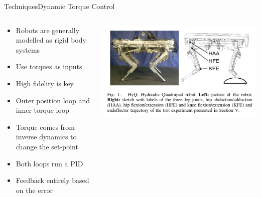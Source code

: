 \documentclass{beamer}
\begin{document}
\begin{frame}{Techniques}{Dynamic Torque Control\cite{6224628}}
\begin{columns}
    \begin{column}{0.47\textwidth}\begin{small}
		\begin{itemize}
			\item Robots are generally modelled as rigid body systems
			\item Use torques as inputs
			\item High fidelity is key
			\item Outer position loop and inner torque loop
			\item Torque comes from inverse dynamics to change the set-point
			\item Both loops run a PID
			\item Feedback entirely based on the error
		\end{itemize}\end{small}
    \end{column}
    \begin{column}{0.5\textwidth}
        \includegraphics[scale=.2]{./images/quad_robot.png}
    \end{column}
\end{columns}
\end{frame}
\end{document}
